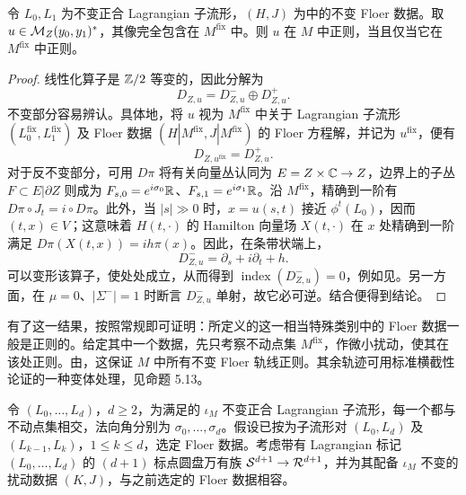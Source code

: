 \begin{lemma}\label{st:14.6}
令 $L_0,L_1$ 为不变正合 Lagrangian 子流形，$(H,J)$ 为中的不变 Floer 数据。取 $u\in\mathcal M_Z(y_0,y_1)^*$，其像完全包含在 $M^{\mathrm{fix}}$ 中。则 $u$ 在 $M$ 中正则，当且仅当它在 $M^{\mathrm{fix}}$ 中正则。
\end{lemma}
\begin{proof}
线性化算子是 $\mathbb Z/2$ 等变的，因此分解为
\[
D_{Z,u}=D^-_{Z,u}\oplus D^+_{Z,u}.
\]
不变部分容易辨认。具体地，将 $u$ 视为 $M^{\mathrm{fix}}$ 中关于 Lagrangian 子流形 $(L_0^{\mathrm{fix}},L_1^{\mathrm{fix}})$ 及 Floer 数据 $(H|M^{\mathrm{fix}},J|M^{\mathrm{fix}})$ 的 Floer 方程解，并记为 $u^{\mathrm{fix}}$，便有
\begin{equation}\label{eq:14.11}
D_{Z,u^{\mathrm{fix}}}=D^+_{Z,u}.
\end{equation}
对于反不变部分，可用 $D\pi$ 将有关向量丛认同为 $E=Z\times\mathbb C\to Z$，边界上的子丛 $F\subset E|\partial Z$ 则成为 $F_{s,0}=e^{i\sigma_0}\mathbb R$、$F_{s,1}=e^{i\sigma_1}\mathbb R$。沿 $M^{\mathrm{fix}}$，精确到一阶有 $D\pi\circ J_t=i\circ D\pi$。此外，当 $|s|\gg0$ 时，$x=u(s,t)$ 接近 $\phi^t(L_0)$，因而 $(t,x)\in V$；这意味着 $H(t,\cdot)$ 的 Hamilton 向量场 $X(t,\cdot)$ 在 $x$ 处精确到一阶满足 $D\pi(X(t,x))=ih\pi(x)$。因此，在条带状端上，
\begin{equation}\label{eq:14.12}
D^-_{Z,u}=\partial_s+i\partial_t+h.
\end{equation}
可以变形该算子，使处处成立，从而得到 $\operatorname{index}(D^-_{Z,u})=0$，例如见。另一方面，在 $\mu=0$、$|\Sigma^-|=1$ 时断言 $D^-_{Z,u}$ 单射，故它必可逆。结合便得到结论。
\end{proof}

有了这一结果，按照常规即可证明：所定义的这一相当特殊类别中的 Floer 数据一般是正则的。给定其中一个数据，先只考察不动点集 $M^{\mathrm{fix}}$，作微小扰动，使其在该处正则。由，这保证 $M$ 中所有不变 Floer 轨线正则。其余轨迹可用标准横截性论证的一种变体处理，见命题 5.13。

令 $(L_0,\ldots,L_d)$，$d\geq2$，为满足的 $\iota_M$ 不变正合 Lagrangian 子流形，每一个都与不动点集相交，法向角分别为 $\sigma_0,\ldots,\sigma_d$。假设已按为子流形对 $(L_0,L_d)$ 及
$(L_{k-1},L_k)$，$1\leq k\leq d$，选定 Floer 数据。考虑带有 Lagrangian 标记 $(L_0,\ldots,L_d)$ 的 $(d+1)$ 标点圆盘万有族 $\mathcal S^{d+1}\to\mathcal R^{d+1}$，并为其配备 $\iota_M$ 不变的扰动数据 $(K,J)$，与之前选定的 Floer 数据相容。

